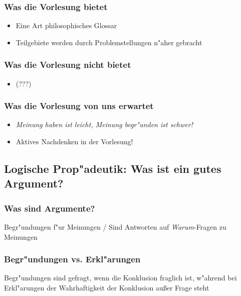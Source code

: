 \documentclass[]{scrartcl}
\begin{document}
\subsubsection{Was die Vorlesung bietet}

\begin{itemize}
  \item Eine Art philosophisches Glossar
  \item Teilgebiete werden durch Problemstellungen n"aher gebracht
\end{itemize}


\subsubsection{Was die Vorlesung nicht bietet}

\begin{itemize}
  \item {\color{red}(???)}
\end{itemize}

\subsubsection{Was die Vorlesung von uns erwartet}

\begin{itemize}
  \item \emph{Meinung haben ist leicht, Meinung begr"unden ist schwer!}
  \item Aktives Nachdenken in der Vorlesung!
\end{itemize}

\subsection{Logische Prop"adeutik: Was ist ein gutes Argument?}

\subsubsection{Was sind Argumente?}

Begr"undungen f"ur Meinungen / Sind Antworten auf \emph{Warum}-Fragen zu Meinungen

\subsubsection{Begr"undungen vs. Erkl"arungen}

Begr"undungen sind gefragt, wenn die Konklusion fraglich ist, w"ahrend bei Erkl"arungen der Wahrhaftigkeit der Konklusion außer Frage steht
\end{document}
